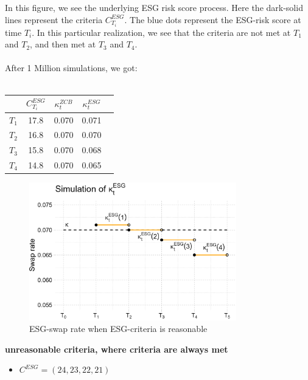 In this figure, we see the underlying ESG risk score process. Here the dark-solid lines represent the criteria $C_{T_{i}}^{ESG}$. The blue dots represent the ESG-risk score at time $T_{i}$.
In this particular realization, we see that the criteria are not met at $T_{1}$ and $T_{2}$, and then met at $T_{3}$ and $T_{4}$. 
\\~\\ 
After 1 Million simulations, we got:
\\~\\
\begin{center}
\begin{tabular}{lcccl}
\toprule
           &$C_{T_{i}}^{ESG}$ & $\kappa_{t}^{ZCB}$  & $\kappa_{t}^{ESG}$ \\
\midrule
$T_{1}$ &  17.8 & 0.070 & 0.071 \\
$T_{2}$ &  16.8 & 0.070 & 0.070 \\
$T_{3}$ &  15.8 & 0.070 & 0.068 \\
$T_{4}$ &  14.8 & 0.070 & 0.065 \\
\bottomrule
\end{tabular}
\end{center}

\begin{figure}[htp]
    \centering
    \includegraphics[width= 9cm]{figures/ESG/kappa_t_ESG_1.png}
    \caption{ESG-swap rate when ESG-criteria is reasonable}
    \label{fig: ESG_swap_1}
\end{figure}

\newpage 
\textbf{unreasonable criteria, where criteria are always met}
\begin{itemize}
    \item $C^{ESG} = (24,23,22,21)$
\end{itemize}

